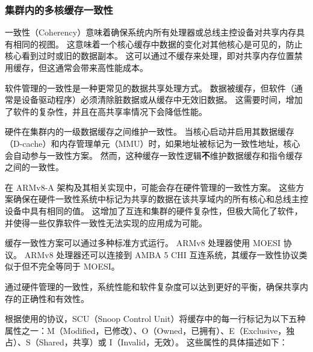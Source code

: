 \subsubsection{集群内的多核缓存一致性}

一致性（Coherency）意味着确保系统内所有处理器或总线主控设备对共享内存具有相同的视图。
这意味着一个核心缓存中数据的变化对其他核心是可见的，防止核心看到过时或旧的数据副本。
这可以通过不缓存来处理，即对共享内存位置禁用缓存，但这通常会带来高性能成本。


软件管理的一致性是一种更常见的数据共享处理方式。
数据被缓存，但软件（通常是设备驱动程序）必须清除脏数据或从缓存中无效旧数据。
这需要时间，增加了软件的复杂性，并且在高共享率情况下会降低性能。


硬件在集群内的一级数据缓存之间维护一致性。
当核心启动并启用其数据缓存（D-cache）和内存管理单元（MMU）时，如果地址被标记为一致性地址，核心会自动参与一致性方案。
然而，这种缓存一致性逻辑\textbf{不}维护数据缓存和指令缓存之间的一致性。

在 ARMv8-A 架构及其相关实现中，可能会存在硬件管理的一致性方案。
这些方案确保在硬件一致性系统中标记为共享的数据在该共享域内的所有核心和总线主控设备中具有相同的值。
这增加了互连和集群的硬件复杂性，但极大简化了软件，并使得一些仅靠软件一致性无法实现的应用成为可能。

缓存一致性方案可以通过多种标准方式运行。
ARMv8 处理器使用 MOESI 协议。
ARMv8 处理器还可以连接到 AMBA 5 CHI 互连系统，其缓存一致性协议类似于但不完全等同于 MOESI。

通过硬件管理的一致性，系统性能和软件复杂度可以达到更好的平衡，确保共享内存的正确性和有效性。

根据使用的协议，SCU（Snoop Control
Unit）将缓存中的每一行标记为以下五种属性之一：M（Modified，已修改）、O（Owned，已拥有）、E（Exclusive，独占）、S（Shared，共享）或 I（Invalid，无效）。
这些属性的具体描述如下：

